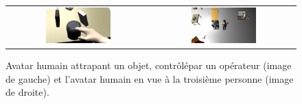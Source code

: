 \documentclass[a4paper,11pt,twoside]{StyleThese}
\begin{document}



\begin{figure}[ht!]
 \centering
 \begin{tabular}{cc}
  \includegraphics[width=0.475\textwidth]{img/Screenshot_from_2014-04-29_14_02_14.png} &
  \includegraphics[width=0.475\textwidth]{img/Screenshot_from_2014-04-29_14_21_24.png}
 \end{tabular}
 \caption{Avatar humain attrapant un objet, contrôlépar un opérateur (image de gauche) et l'avatar humain en vue à la troisième personne (image de droite).}
 \label{fig:human_morse}
 \end{figure}
\end{document}
